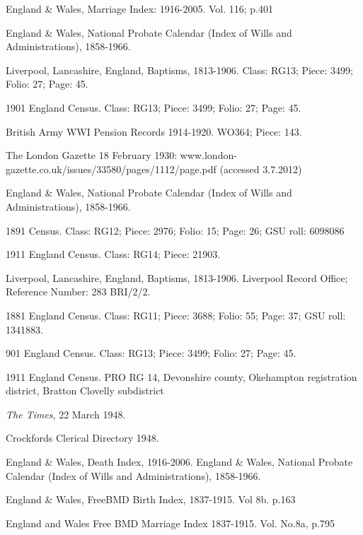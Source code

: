 \begin{thebibliography}{99}
	England \& Wales, Marriage Index: 1916-2005. Vol. 116; p.401

	 England \& Wales, National Probate Calendar (Index of Wills and Administrations), 1858-1966.

	Liverpool, Lancashire, England, Baptisms, 1813-1906.
	Class: RG13; Piece: 3499; Folio: 27; Page: 45.

	1901 England Census.
	Class: RG13; Piece: 3499; Folio: 27; Page: 45.

	British Army WWI Pension Records 1914-1920.  WO364; Piece: 143.

	 The London Gazette 18 February 1930: www.london-gazette.co.uk/issues/33580/pages/1112/page.pdf (accessed 3.7.2012)

	England \& Wales, National Probate Calendar (Index of Wills and Administrations), 1858-1966.

	1891 Census. Class: RG12; Piece: 2976; Folio: 15; Page: 26; GSU roll: 6098086

	1911 England Census. Class: RG14; Piece: 21903.

	Liverpool, Lancashire, England, Baptisms, 1813-1906.
	Liverpool Record Office; Reference Number: 283 BRI/2/2.

	1881 England Census. Class: RG11; Piece: 3688; Folio: 55; Page: 37; GSU roll: 1341883.

	901 England Census. Class: RG13; Piece: 3499; Folio: 27; Page: 45.

	1911 England Census. PRO RG 14, Devonshire county, Okehampton registration district,
	Bratton Clovelly subdistrict

	\emph{The Times}, 22 March 1948.

	 Crockfords Clerical Directory 1948.

	 England \& Wales, Death Index, 1916-2006.
	 England \& Wales, National Probate Calendar (Index of Wills and Administrations), 1858-1966.

	England \& Wales, FreeBMD Birth Index, 1837-1915. Vol 8b. p.163

	England and Wales Free BMD Marriage Index 1837-1915. Vol. No.8a, p.795


\end{thebibliography}
